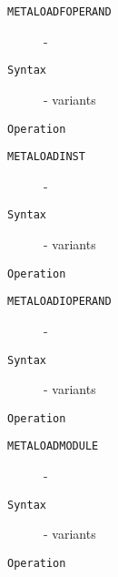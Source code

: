 \clearpage
\begin{description}
\item[\texttt{METALOADFOPERAND}]  - \\
\item[\texttt{Syntax}] - variants\\

\item[\texttt{Operation}]
\item[\texttt{}]
\end{description}
\clearpage
\begin{description}
\item[\texttt{METALOADINST}]  - \\
\item[\texttt{Syntax}] - variants\\

\item[\texttt{Operation}]
\item[\texttt{}]
\end{description}
\clearpage
\begin{description}
\item[\texttt{METALOADIOPERAND}]  - \\
\item[\texttt{Syntax}] - variants\\

\item[\texttt{Operation}]
\item[\texttt{}]
\end{description}
\clearpage
\begin{description}
\item[\texttt{METALOADMODULE}]  - \\
\item[\texttt{Syntax}] - variants\\

\item[\texttt{Operation}]
\item[\texttt{}]
\end{description}
